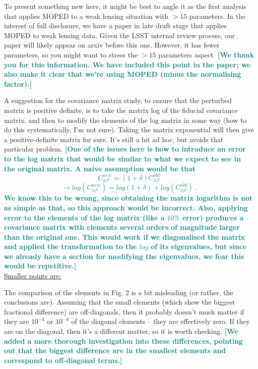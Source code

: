 \documentclass{article}
\newcommand\reply[1]{{\bf {\textcolor{teal}{[#1]}}}}
\begin{document}
	To present something new here, it might be best to angle it as the first analysis that applies MOPED to a weak lensing situation with $>15$ parameters.   In the interest of full disclosure, we have a paper in late draft stage that applies MOPED to weak lensing data.  Given the LSST internal review process, our paper will likely appear on arxiv before this one.  However, it has fewer parameters, so you might want to stress the $>15$ parameters aspect.
	\reply{We thank you for this information. We have included this point in the paper; we also make it clear that we're using MOPED (minus the normalising factor).}
	
	A suggestion for the covariance matrix study, to ensure that the perturbed matrix is positive definite, is to take the matrix log of the fiducial covariance matrix, and then to modify the elements of the log matrix in some way (how to do this systematically, I’m not sure).  Taking the matrix exponential will then give a positive-definite matrix for sure. It’s still a bit ad hoc, but avoids that particular problem. 
	\reply{One of the issues here is how to introduce an error to the log matrix that would be similar to what we expect to see in the original matrix. A naive assumption would be that 
	$$C^{new}_{\alpha \beta} = (1 + \delta)C^{old}_{\alpha \beta}$$
	$$\rightarrow log \left( C^{new}_{\alpha \beta}\right) = log(1 + \delta) + log \left( C^{old}_{\alpha \beta} \right)\ .$$ We know this to be wrong, since obtaining the matrix logarithm is not as simple as that, so this approach would be incorrect. Also, applying error to the elements of the log matrix (like a $10\%$ error) produces a covariance matrix with elements several orders of magnitude larger than the original one. This would work if we diagonalised the matrix and applied the transformation to the $log$ of its eigenvalues, but since we already have a section for modifying the eigenvalues, we fear this would be repetitive.}\\

	\underline{Smaller points are:}
	
	The comparison of the elements in Fig. 2 is a bit misleading (or rather, the conclusions are).  Assuming that the small elements (which show the biggest fractional difference) are off-diagonals, then it probably doesn’t much matter if they are $10^{-4}$ or $10^{-8}$ of the diagonal elements – they are effectively zero.  If they are on the diagonal, then it’s a different matter, so it is worth checking. \reply{We added a more thorough investigation into these differences, pointing out that the biggest difference are in the smallest elements and correspond to off-diagonal terms.}
	
\end{document}
